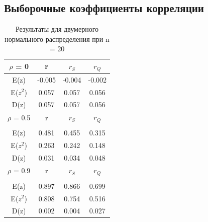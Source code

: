 \documentclass[a4]{article}
\begin{document}
		\subsection{Выборочные коэффициенты корреляции}
		\begin{table}[h!]
			
			\caption{Результаты для двумерного нормального распределения при  n = 20}
			\label{tab:my_label}
			\begin{center}
				\vspace{5mm}
				\begin{tabular}{|c|c|c|c|}
					\hline
					$\rho$ = 0 & r & $r_S$ & $r_Q$ \\
					\hline
					E(z) & -0.005 & -0.004 & -0.002\\
					\hline
					E($z^2$)   & 0.057 & 0.057 & 0.056\\
					\hline
					D(z)   & 0.057 & 0.057 & 0.056 \\
					\hline
					$\rho$ = 0.5 & r & $r_S$ & $r_Q$ \\
					\hline\\
					\hline
					E(z) & 0.481 & 0.455 & 0.315\\
					\hline
					E($z^2$)   & 0.263 & 0.242 & 0.148\\
					\hline
					D(z)   & 0.031 & 0.034 & 0.048 \\
					\hline
					$\rho$ = 0.9 & r & $r_S$ & $r_Q$ \\
					\hline\\
					\hline
					E(z) & 0.897 & 0.866 & 0.699\\
					\hline
					E($z^2$)   & 0.808 & 0.754 & 0.516\\
					\hline
					D(z)   & 0.002 & 0.004 & 0.027 \\
					\hline
				\end{tabular}
				
			\end{center}
			
		\end{table}
		
\end{document}
